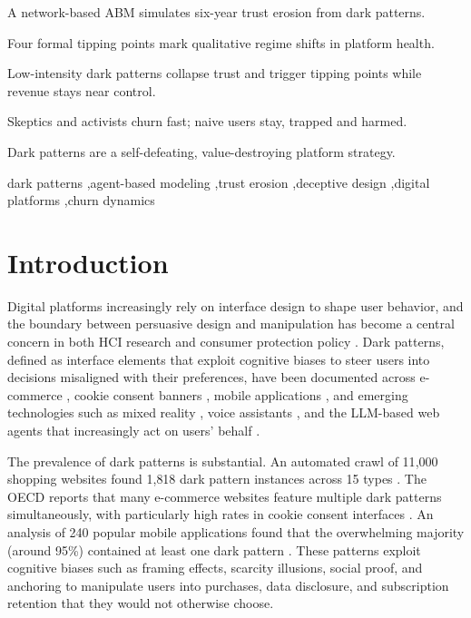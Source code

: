 \documentclass[a4paper,fleqn]{cas-sc}
\begin{document}
\begin{highlights}
\item A network-based ABM simulates six-year trust erosion from dark patterns.
\item Four formal tipping points mark qualitative regime shifts in platform health.
\item Low-intensity dark patterns collapse trust and trigger tipping points while revenue stays near control.
\item Skeptics and activists churn fast; naive users stay, trapped and harmed.
\item Dark patterns are a self-defeating, value-destroying platform strategy.
\end{highlights}

\begin{keywords}
dark patterns \sep agent-based modeling \sep trust erosion \sep deceptive design \sep digital platforms \sep churn dynamics
\end{keywords}

\maketitle

\section{Introduction}
Digital platforms increasingly rely on interface design to shape user behavior, and the boundary between persuasive design and manipulation has become a central concern in both HCI research and consumer protection policy \citep{gray2018,yi2025}. Dark patterns, defined as interface elements that exploit cognitive biases to steer users into decisions misaligned with their preferences, have been documented across e-commerce \citep{mathur2019}, cookie consent banners \citep{berens2024}, mobile applications \citep{gunawan2021}, and emerging technologies such as mixed reality \citep{meinhardt2025}, voice assistants \citep{deconca2023}, and the LLM-based web agents that increasingly act on users' behalf \citep{ersoy2026}.

The prevalence of dark patterns is substantial. An automated crawl of 11{,}000 shopping websites found 1{,}818 dark pattern instances across 15 types \citep{mathur2019}. The OECD reports that many e-commerce websites feature multiple dark patterns simultaneously, with particularly high rates in cookie consent interfaces \citep{oecd2022}. An analysis of 240 popular mobile applications found that the overwhelming majority (around 95\%) contained at least one dark pattern \citep{digeronimo2020}. These patterns exploit cognitive biases such as framing effects, scarcity illusions, social proof, and anchoring to manipulate users into purchases, data disclosure, and subscription retention that they would not otherwise choose.
\end{document}
